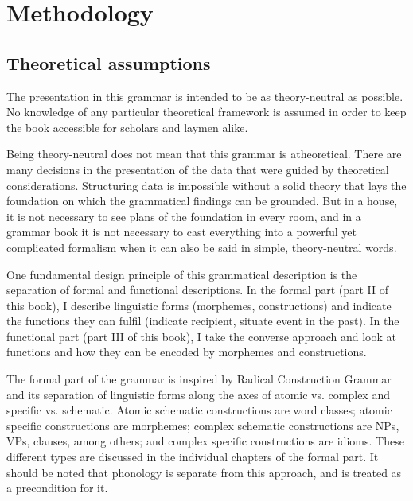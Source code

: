 \chapter{Methodology}
\section{Theoretical assumptions}
The presentation in this grammar is intended to be as theory-neutral as possible. No knowledge of any particular theoretical framework is assumed in order to keep the book accessible for  scholars and laymen alike.

Being theory-neutral does not mean that this grammar is atheoretical. There are many decisions in the presentation of the data that were guided by theoretical considerations. Structuring data is impossible without a solid theory that lays the foundation on which the grammatical findings can be grounded. But in a house, it is not necessary to see plans of the foundation in every room, and in a grammar book it is not necessary to cast everything into a powerful yet complicated formalism when it can also be said in simple, theory-neutral words.

One fundamental design principle of this grammatical description is the separation of formal and functional descriptions. In the formal part (part II of this book), I describe linguistic forms (morphemes, constructions) and indicate the functions they can fulfil (indicate recipient, situate event in the past). In the functional part (part III of this book), I take the converse approach and look at functions and how they can be encoded by morphemes and constructions.

The formal part of the grammar is inspired by Radical Construction Grammar \citep{Croft2001rcg} and its separation of linguistic forms along the axes of atomic vs. complex and specific vs. schematic. Atomic schematic constructions are word classes; atomic specific constructions are morphemes; complex schematic constructions are NPs, VPs, clauses, among others; and complex specific constructions are idioms. These different types are discussed in the individual chapters of the formal part. It should be noted that phonology is separate from this approach, and is treated as a precondition for it.

